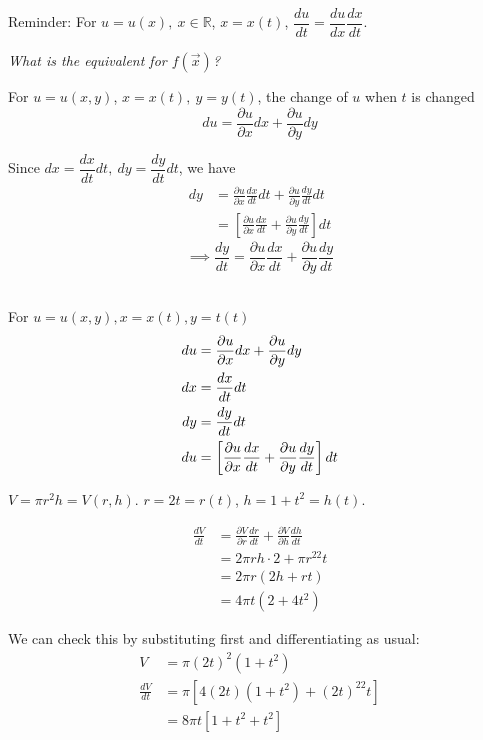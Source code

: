 \documentclass[10pt]{scrartcl}
\begin{document}

Reminder: For $u = u(x),~ x \in \mathbb{R}$, $x = x(t)$, $\dfrac{du}{dt} = \dfrac{du}{dx}\dfrac{dx}{dt}$. 

\emph{What is the equivalent for $f(\vec{x})$?}

For $u = u(x,y)$, $x = x(t),~y = y(t)$, the change of $u$ when $t$ is changed
\[du = \frac{\partial u}{\partial x}dx + \frac{\partial u}{\partial y}dy\]

Since $dx = \dfrac{dx}{dt}dt,~ dy = \dfrac{dy}{dt}dt$, we have
\[\begin{aligned}dy &= \frac{\partial u}{\partial x}\frac{dx}{dt}dt + \frac{\partial u}{\partial y}\frac{dy}{dt}dt\\
&= \left[\frac{\partial u}{\partial x}\frac{dx}{dt} + \frac{\partial u}{\partial y}\frac{dy}{dt}\right]dt
\end{aligned}
\]
\begin{equation}
\implies \boxed{\frac{dy}{dt} = \frac{\partial u}{\partial x}\frac{dx}{dt} + \frac{\partial u}{\partial y}\frac{dy}{dt}}
\end{equation}~

For $u = u(x,y), x = x(t), y=t(t)$
\[
\begin{aligned}
  du &= \frac{\partial u}{\partial x}dx + \frac{\partial u}{\partial y}dy\\
  dx &= \frac{dx}{dt}dt\\
  dy &= \frac{dy}{dt}dt\\
  du &= \left[\frac{\partial u}{\partial x}\frac{dx}{dt} + \frac{\partial u}{\partial y}\frac{dy}{dt}\right]dt
\end{aligned}
\]

\begin{example}
$V = \pi r^2h = V(r,h)$. $r = 2t = r(t)$, $h = 1+t^2 = h(t)$. 

\setlength{\jot}{10pt} 
\[\begin{aligned}\frac{dV}{dt} &= \frac{\partial V}{\partial r}\frac{dr}{dt} + \frac{\partial V}{\partial h}\frac{dh}{dt}\\
	&= 2\pi rh \cdot 2 + \pi r^22t\\ &= 2\pi r(2h+rt)\\ 
	&= 4\pi t(2 + 4t^2)
\end{aligned}
\]

We can check this by substituting first and differentiating as usual: 
\[
\begin{aligned}
  V &= \pi (2t)^2(1+t^2)\\
  \frac{dV}{dt} &= \pi[4(2t)(1+t^2) + (2t)^22t]\\
  &= 8\pi t[1 + t^2 + t^2]
\end{aligned}
\]

\end{example}
\end{document}
